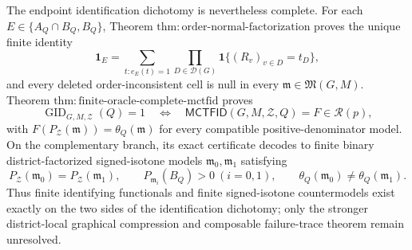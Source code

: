 The endpoint identification dichotomy is nevertheless complete. For each \(E\in\{A_Q\cap B_Q,B_Q\}\), Theorem \(\mathrm{thm:order\text{-}normal\text{-}factorization}\) proves the unique finite identity
\[
 \mathbf 1_E=\sum_{t:e_E(t)=1}\prod_{D\in\mathcal D(G)}\mathbf 1\{(R_v)_{v\in D}=t_D\},
\]
and every deleted order-inconsistent cell is null in every \(\mathfrak m\in\mathfrak M(G,M)\). Theorem \(\mathrm{thm:finite\text{-}oracle\text{-}complete\text{-}mctfid}\) proves
\[
 \operatorname{GID}_{G,M,\mathcal Z}(Q)=1
 \quad\Longleftrightarrow\quad
 \mathsf{MCTFID}(G,M,\mathcal Z,Q)=F\in\mathcal R(p),
\]
with \(F(P_{\mathcal Z}(\mathfrak m))=\theta_Q(\mathfrak m)\) for every compatible positive-denominator model. On the complementary branch, its exact certificate decodes to finite binary district-factorized signed-isotone models \(\mathfrak m_0,\mathfrak m_1\) satisfying
\[
 P_{\mathcal Z}(\mathfrak m_0)=P_{\mathcal Z}(\mathfrak m_1),\qquad
 P_{\mathfrak m_i}(B_Q)>0\ (i=0,1),\qquad
 \theta_Q(\mathfrak m_0)\ne\theta_Q(\mathfrak m_1).
\]
Thus finite identifying functionals and finite signed-isotone countermodels exist exactly on the two sides of the identification dichotomy; only the stronger district-local graphical compression and composable failure-trace theorem remain unresolved.